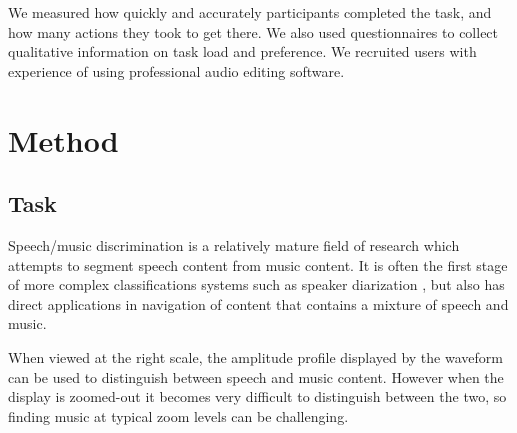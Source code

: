 We measured how quickly and accurately participants completed the task, and how many actions they took to get there. We
also used questionnaires to collect qualitative information on task load and preference.
We recruited users with experience of using professional audio editing software.






\section{Method}

\subsection{Task}
Speech/music discrimination is a relatively mature field of research which attempts to segment speech content from
music content. It is often the first stage of more complex classifications systems such as speaker diarization
\citep{AngueraMiro2012}, but also has direct applications in navigation of content that contains a mixture of speech
and music.

When viewed at the right scale, the amplitude profile displayed by the waveform can be used to distinguish between
speech and music content. However when the display is zoomed-out it becomes very difficult to distinguish between the
two, so finding music at typical zoom levels can be challenging.

